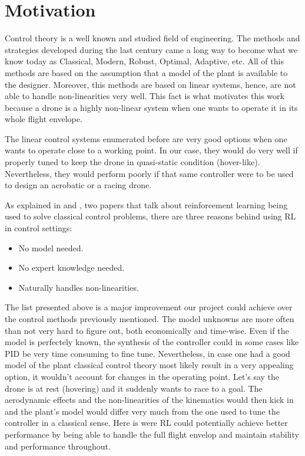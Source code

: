 \section{Motivation}

Control theory is a well known and studied field of engineering. The methods and 
strategies developed during the last century came a long way to become what we 
know today as Classical, Modern, Robust, Optimal, Adaptive, etc. All of this methods 
are based on the assumption that a model of the plant is available to the designer.
Moreover, this methods are based on linear systems, hence, are not able to handle 
non-linearities very well. This fact is what motivates this work because a drone 
is a highly non-linear system when one wants to operate it in its whole flight 
envelope.

The linear control systems enumerated before are very good options when one wants to 
operate close to a working point. In our case, they would do very well if properly 
tuned to keep the drone in quasi-static condition (hover-like). Nevertheless, they 
would perform poorly if that same controller were to be used to design an acrobatic 
or a racing drone. 

As explained in \cite{control} and \cite{adversarial}, two papers that talk about reinforcement learning being used to solve classical control problems, there are three reasons behind using RL in control settings:

\begin{itemize}
    \item No model needed.
    \item No expert knowledge needed.
    \item Naturally handles non-linearities.
\end{itemize}

The list presented above is a major improvement our project could achieve over 
the control methods previously mentioned. The model unknowns are more often than 
not very hard to figure out, both economically and time-wise. Even if the model 
is perfectely known, the synthesis of the controller could in some cases like PID
be very time consuming to fine tune. Nevertheless, in case one had a good model of 
the plant classical control theory most likely result in a very appealing option, 
it wouldn't account for changes in the operating point. Let's say the drone is 
at rest (hovering) and it suddenly wants to race to a goal. The aerodynamic 
effects and the non-linearities of the kinematics would then kick in and the plant's 
model would differ very much from the one used to tune the controller in a classical 
sense. Here is were RL could potentially achieve better performance by being able 
to handle the full flight envelop and maintain stability and performance throughout.